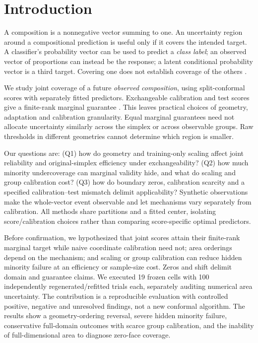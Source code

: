 \section{Introduction}
A composition is a nonnegative vector summing to one. An uncertainty region around a compositional prediction is useful only if it covers the intended target. A classifier's probability vector can be used to predict a \emph{class label}; an observed vector of proportions can instead be the response; a latent conditional probability vector is a third target. Covering one does not establish coverage of the others \citep{angelopoulos2020raps,javanmardi2024credal}.

We study joint coverage of a future \emph{observed composition}, using split-conformal scores with separately fitted predictors. Exchangeable calibration and test scores give a finite-rank marginal guarantee \citep{papadopoulos2002inductive,lei2016distribution,angelopoulos2021gentle}. This leaves practical choices of geometry, adaptation and calibration granularity. Equal marginal guarantees need not allocate uncertainty similarly across the simplex or across observable groups. Raw thresholds in different geometries cannot determine which region is smaller.

Our questions are: (Q1) how do geometry and training-only scaling affect joint reliability and original-simplex efficiency under exchangeability? (Q2) how much minority undercoverage can marginal validity hide, and what do scaling and group calibration cost? (Q3) how do boundary zeros, calibration scarcity and a specified calibration--test mismatch delimit applicability? Synthetic observations make the whole-vector event observable and let mechanisms vary separately from calibration. All methods share partitions and a fitted center, isolating score/calibration choices rather than comparing score-specific optimal predictors.

Before confirmation, we hypothesized that joint scores attain their finite-rank marginal target while naive coordinate calibration need not; area orderings depend on the mechanism; and scaling or group calibration can reduce hidden minority failure at an efficiency or sample-size cost. Zeros and shift delimit domain and guarantee claims. We executed 19 frozen cells with 100 independently regenerated/refitted trials each, separately auditing numerical area uncertainty. The contribution is a reproducible evaluation with controlled positive, negative and unresolved findings, not a new conformal algorithm. The results show a geometry-ordering reversal, severe hidden minority failure, conservative full-domain outcomes with scarce group calibration, and the inability of full-dimensional area to diagnose zero-face coverage.
